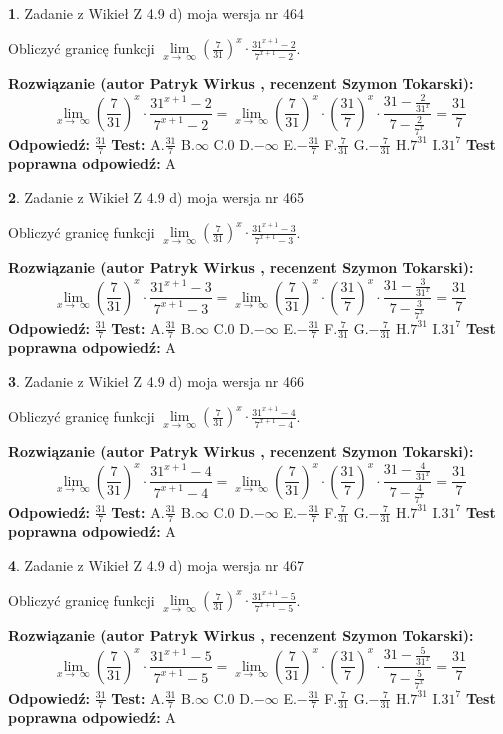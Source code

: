 \documentclass[12pt, a4paper]{article}
\theoremstyle{definition} %
\newtheorem{zad}{}
\newcommand{\zadStart}[1]{\begin{zad}#1\newline}
\newcommand{\zadStop}{\end{zad}}
\newcommand{\rozwStart}[2]{\noindent \textbf{Rozwiązanie (autor #1 , recenzent #2): }\newline}
\newcommand{\rozwStop}{\newline}
\newcommand{\odpStart}{\noindent \textbf{Odpowiedź:}\newline}
\newcommand{\odpStop}{\newline}
\newcommand{\testStart}{\noindent \textbf{Test:}\newline}
\newcommand{\testStop}{\newline}
\newcommand{\kluczStart}{\noindent \textbf{Test poprawna odpowiedź:}\newline}
\newcommand{\kluczStop}{\newline}
\begin{document}
\zadStart{Zadanie z Wikieł Z 4.9 d) moja wersja nr 464}


Obliczyć granicę funkcji  $\lim\limits_{x\to\ \infty}(\frac{7}{31})^{x}\cdot\frac{31^{x+1}-2}{7^{x+1}-2}$.
\zadStop
\rozwStart{Patryk Wirkus}{Szymon Tokarski}
$$\lim\limits_{x\to\ \infty}(\frac{7}{31})^{x}\cdot\frac{31^{x+1}-2}{7^{x+1}-2}=\lim\limits_{x\to\ \infty}(\frac{7}{31})^{x}\cdot(\frac{31}{7})^{x} \cdot \frac{31-\frac{2}{31^{x}}}{7-\frac{2}{7^{x}}} = \frac{31}{7}$$
\rozwStop
\odpStart
$\frac{31}{7}$
\odpStop
\testStart
A.$\frac{31}{7}$ B.$\infty$ C.$0$ D.$-\infty$ E.$-\frac{31}{7}$
F.$\frac{7}{31}$ G.$-\frac{7}{31}$
H.$7^{31}$
I.$31^{7}$
\testStop
\kluczStart
A
\kluczStop



\zadStart{Zadanie z Wikieł Z 4.9 d) moja wersja nr 465}


Obliczyć granicę funkcji  $\lim\limits_{x\to\ \infty}(\frac{7}{31})^{x}\cdot\frac{31^{x+1}-3}{7^{x+1}-3}$.
\zadStop
\rozwStart{Patryk Wirkus}{Szymon Tokarski}
$$\lim\limits_{x\to\ \infty}(\frac{7}{31})^{x}\cdot\frac{31^{x+1}-3}{7^{x+1}-3}=\lim\limits_{x\to\ \infty}(\frac{7}{31})^{x}\cdot(\frac{31}{7})^{x} \cdot \frac{31-\frac{3}{31^{x}}}{7-\frac{3}{7^{x}}} = \frac{31}{7}$$
\rozwStop
\odpStart
$\frac{31}{7}$
\odpStop
\testStart
A.$\frac{31}{7}$ B.$\infty$ C.$0$ D.$-\infty$ E.$-\frac{31}{7}$
F.$\frac{7}{31}$ G.$-\frac{7}{31}$
H.$7^{31}$
I.$31^{7}$
\testStop
\kluczStart
A
\kluczStop



\zadStart{Zadanie z Wikieł Z 4.9 d) moja wersja nr 466}


Obliczyć granicę funkcji  $\lim\limits_{x\to\ \infty}(\frac{7}{31})^{x}\cdot\frac{31^{x+1}-4}{7^{x+1}-4}$.
\zadStop
\rozwStart{Patryk Wirkus}{Szymon Tokarski}
$$\lim\limits_{x\to\ \infty}(\frac{7}{31})^{x}\cdot\frac{31^{x+1}-4}{7^{x+1}-4}=\lim\limits_{x\to\ \infty}(\frac{7}{31})^{x}\cdot(\frac{31}{7})^{x} \cdot \frac{31-\frac{4}{31^{x}}}{7-\frac{4}{7^{x}}} = \frac{31}{7}$$
\rozwStop
\odpStart
$\frac{31}{7}$
\odpStop
\testStart
A.$\frac{31}{7}$ B.$\infty$ C.$0$ D.$-\infty$ E.$-\frac{31}{7}$
F.$\frac{7}{31}$ G.$-\frac{7}{31}$
H.$7^{31}$
I.$31^{7}$
\testStop
\kluczStart
A
\kluczStop



\zadStart{Zadanie z Wikieł Z 4.9 d) moja wersja nr 467}


Obliczyć granicę funkcji  $\lim\limits_{x\to\ \infty}(\frac{7}{31})^{x}\cdot\frac{31^{x+1}-5}{7^{x+1}-5}$.
\zadStop
\rozwStart{Patryk Wirkus}{Szymon Tokarski}
$$\lim\limits_{x\to\ \infty}(\frac{7}{31})^{x}\cdot\frac{31^{x+1}-5}{7^{x+1}-5}=\lim\limits_{x\to\ \infty}(\frac{7}{31})^{x}\cdot(\frac{31}{7})^{x} \cdot \frac{31-\frac{5}{31^{x}}}{7-\frac{5}{7^{x}}} = \frac{31}{7}$$
\rozwStop
\odpStart
$\frac{31}{7}$
\odpStop
\testStart
A.$\frac{31}{7}$ B.$\infty$ C.$0$ D.$-\infty$ E.$-\frac{31}{7}$
F.$\frac{7}{31}$ G.$-\frac{7}{31}$
H.$7^{31}$
I.$31^{7}$
\testStop
\kluczStart
A
\kluczStop
\end{document}
